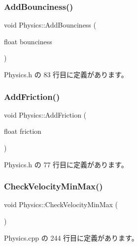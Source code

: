 \subsubsection{\texorpdfstring{Add\+Bounciness()}{AddBounciness()}}
{\footnotesize\ttfamily void Physics\+::\+Add\+Bounciness (\begin{DoxyParamCaption}\item[{float}]{bounciness }\end{DoxyParamCaption})\hspace{0.3cm}{\ttfamily [inline]}}



 Physics.\+h の 83 行目に定義があります。

\mbox{\label{class_physics_a77e9a04f034ccad4fec996832fb7ce63}} 
\subsubsection{\texorpdfstring{Add\+Friction()}{AddFriction()}}
{\footnotesize\ttfamily void Physics\+::\+Add\+Friction (\begin{DoxyParamCaption}\item[{float}]{friction }\end{DoxyParamCaption})\hspace{0.3cm}{\ttfamily [inline]}}



 Physics.\+h の 77 行目に定義があります。

\mbox{\label{class_physics_af6ad00988f0aa878285b930121d4748c}} 
\subsubsection{\texorpdfstring{Check\+Velocity\+Min\+Max()}{CheckVelocityMinMax()}}
{\footnotesize\ttfamily void Physics\+::\+Check\+Velocity\+Min\+Max (\begin{DoxyParamCaption}{ }\end{DoxyParamCaption})\hspace{0.3cm}{\ttfamily [private]}}



 Physics.\+cpp の 244 行目に定義があります。

